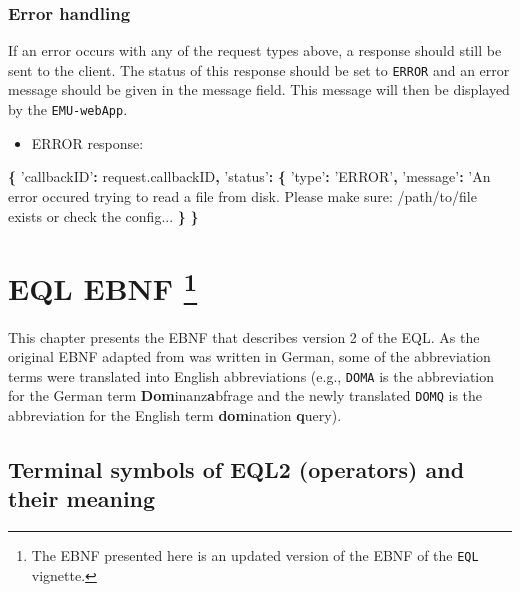 \documentclass[]{book}
\newenvironment{Shaded}{\begin{snugshade}}{\end{snugshade}}
\newcommand{\AttributeTok}[1]{\textcolor[rgb]{0.77,0.63,0.00}{#1}}
\newcommand{\NormalTok}[1]{#1}
\newcommand{\OperatorTok}[1]{\textcolor[rgb]{0.81,0.36,0.00}{\textbf{#1}}}
\newcommand{\StringTok}[1]{\textcolor[rgb]{0.31,0.60,0.02}{#1}}
\newcommand{\VariableTok}[1]{\textcolor[rgb]{0.00,0.00,0.00}{#1}}
\providecommand{\tightlist}{%
  \setlength{\itemsep}{0pt}\setlength{\parskip}{0pt}}
\let\rmarkdownfootnote\footnote%
\def\footnote{\protect\rmarkdownfootnote}
\theoremstyle{definition}
\theoremstyle{definition}
\theoremstyle{definition}
\theoremstyle{remark}
\begin{document}
\hypertarget{error-handling}{%
\subsection{Error handling}\label{error-handling}}

If an error occurs with any of the request types above, a response
should still be sent to the client. The status of this response should
be set to \texttt{ERROR} and an error message should be given in the
message field. This message will then be displayed by the
\texttt{EMU-webApp}.

\begin{itemize}
\tightlist
\item
  ERROR response:
\end{itemize}

\begin{Shaded}
\begin{Highlighting}[]
\OperatorTok{\{}
  \StringTok{'callbackID'}\OperatorTok{:} \VariableTok{request}\NormalTok{.}\AttributeTok{callbackID}\OperatorTok{,}
  \StringTok{'status'}\OperatorTok{:} \OperatorTok{\{}
    \StringTok{'type'}\OperatorTok{:} \StringTok{'ERROR'}\OperatorTok{,}
    \StringTok{'message'}\OperatorTok{:} \StringTok{'An error occured trying to read a file from disk. Please make sure: /path/to/file exists or check the config...}
  \OperatorTok{\}}
\OperatorTok{\}}
\end{Highlighting}
\end{Shaded}

\hypertarget{app-chap:EQL-EBNF}{%
\chapter[EQL EBNF ]{\texorpdfstring{EQL EBNF \footnote{The EBNF
  presented here is an updated version of the EBNF of the \texttt{EQL}
  vignette.}}{EQL EBNF }}\label{app-chap:EQL-EBNF}}

This chapter presents the EBNF \citep{garshol:2003a} that describes
version 2 of the EQL. As the original EBNF adapted from
\citet{john:2012a} was written in German, some of the abbreviation terms
were translated into English abbreviations (e.g., \texttt{DOMA} is the
abbreviation for the German term \textbf{Dom}inanz\textbf{a}bfrage and
the newly translated \texttt{DOMQ} is the abbreviation for the English
term \textbf{dom}ination \textbf{q}uery).

\hypertarget{terminal-symbols-of-eql2-operators-and-their-meaning}{%
\section{Terminal symbols of EQL2 (operators) and their
meaning}\label{terminal-symbols-of-eql2-operators-and-their-meaning}}
\end{document}
